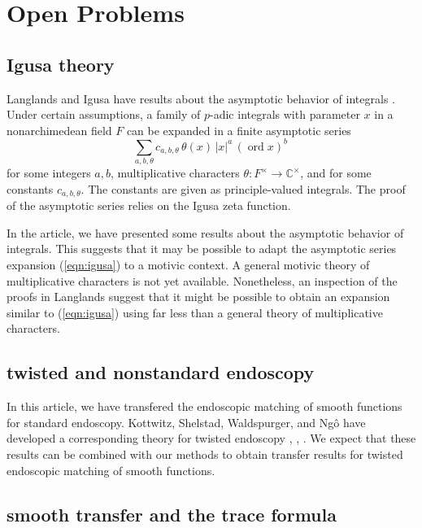 \documentclass[12pt]{amsart}
\newcommand{\op}[1]{\operatorname{#1}}
\newcommand{\ring}[1]{{\mathbb #1}}
\theoremstyle{plain}
\theoremstyle{definition}
\begin{document}
\section{Open Problems}

\subsection{Igusa theory}

Langlands and Igusa have results about the asymptotic behavior of
integrals \cite{langlands1983orbital} \cite{igusa1978lectures}.  Under
certain assumptions, a family of $p$-adic integrals with parameter $x$
in a nonarchimedean field $F$ can be expanded in a finite asymptotic
series
\begin{equation}\label{eqn:igusa}
\sum_{a,b,\theta} c_{a,b,\theta} \,
\theta(x) \,|x|^a \, (\op{ord}x)^b\, 
\end{equation}
for some integers $a,b$, multiplicative characters $\theta:F^\times\to
\ring{C}^\times$, and for some constants $c_{a,b,\theta}$.  The
constants are given as principle-valued integrals.  The proof of the
asymptotic series relies on the Igusa zeta function.

In the article, we have presented some results about the asymptotic
behavior of integrals.  This suggests that it may be possible to adapt
the asymptotic series expansion (\ref{eqn:igusa}) to a motivic
context.  A general motivic theory of multiplicative characters is
not yet available.  Nonetheless, an inspection of the proofs in
Langlands suggest that it might be possible to obtain an
expansion similar to (\ref{eqn:igusa}) using far less than a general
theory of multiplicative characters.

\subsection{twisted and nonstandard endoscopy}

In this article, we have transfered the endoscopic matching of smooth
functions for standard endoscopy.  Kottwitz, Shelstad, Waldspurger,
and Ng\^o have developed a corresponding theory for twisted endoscopy
\cite{kottwitz1999foundations}, \cite{waldspurger2008endoscopie}, \cite{ngo2010lemme}.  We expect
that these results can be combined with our methods to obtain transfer
results for twisted endoscopic matching of smooth functions.

\subsection{smooth transfer and the trace formula}
\end{document}
